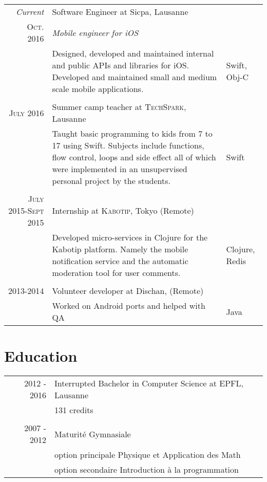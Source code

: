 \documentclass[a4paper,10pt]{article} %
\begin{document}
\begin{tabular}{r|p{8cm}|l}
\emph{Current} & Software Engineer at Sicpa, Lausanne\\
\textsc{Oct. 2016} & \emph{Mobile engineer for iOS}\\ 
& \footnotesize{Designed, developed and maintained internal and public APIs and libraries for iOS. Developed and maintained small and medium scale mobile applications.} & Swift, Obj-C\\
\multicolumn{2}{c}{} \\

\textsc{July 2016} & Summer camp teacher at \textsc{TechSpark}, Lausanne \emph{}\\
& \footnotesize{Taught basic programming to kids from 7 to 17 using Swift. Subjects include functions, flow control, loops and side effect all of which were implemented in an unsupervised personal project by the students.} & Swift\\
\multicolumn{2}{c}{}\\


\textsc{July 2015-Sept 2015} & Internship at \textsc{Kabotip}, Tokyo (Remote) \emph{}\\
& \footnotesize{Developed micro-services in Clojure for the Kabotip platform. Namely the mobile notification service and the automatic moderation tool for user comments.} & Clojure, Redis\\
\multicolumn{2}{c}{}\\


\textsc{2013-2014} & Volunteer developer at Dischan, (Remote)\\
& \footnotesize{Worked on Android ports and helped with QA} & Java
\end{tabular}


\section{Education}

\begin{tabular}{rl}	
2012 - 2016 & Interrupted Bachelor in Computer Science at EPFL, Lausanne\\
& \footnotesize{131 credits}\\
\multicolumn{2}{c}{}\\


2007 - 2012 & Maturité Gymnasiale\\ & option principale Physique et Application des Math\\ & option secondaire Introduction à la programmation\\
\end{tabular}
\end{document}
